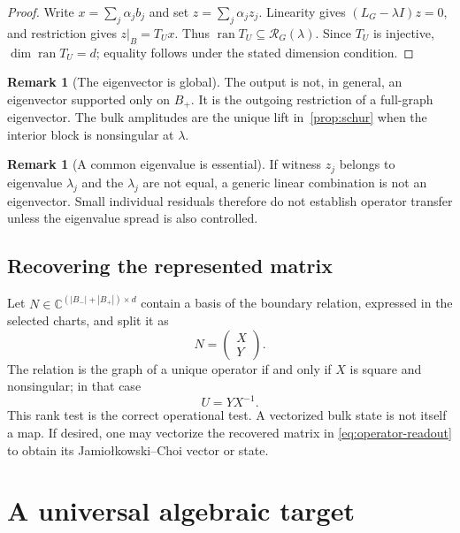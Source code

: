 \documentclass[11pt]{article}
\numberwithin{equation}{section}
\theoremstyle{definition}
\newtheorem{remark}[theorem]{Remark}
\theoremstyle{remark}
\newcommand{\C}{\mathbb{C}}
\newcommand{\ran}{\operatorname{ran}}
\begin{document}
\begin{proof}
Write $x=\sum_j\alpha_jb_j$ and set $z=\sum_j\alpha_jz_j$.  Linearity gives
$(L_G-\lambda I)z=0$, and restriction gives
$z|_B=T_Ux$.  Thus $\ran T_U\subseteq\mathcal R_G(\lambda)$.  Since $T_U$ is
injective, $\dim\ran T_U=d$; equality follows under the stated dimension
condition.
\end{proof}

\begin{remark}[The eigenvector is global]
The output is not, in general, an eigenvector supported only on $B_+$.  It is
the outgoing restriction of a full-graph eigenvector.  The bulk amplitudes are
the unique lift in~\cref{prop:schur} when the interior block is nonsingular at
$\lambda$.
\end{remark}

\begin{remark}[A common eigenvalue is essential]
If witness $z_j$ belongs to eigenvalue $\lambda_j$ and the $\lambda_j$ are not
equal, a generic linear combination is not an eigenvector.  Small individual
residuals therefore do not establish operator transfer unless the eigenvalue
spread is also controlled.
\end{remark}

\subsection{Recovering the represented matrix}

Let $N\in\C^{(|B_-|+|B_+|)\times d}$ contain a basis of the boundary relation,
expressed in the selected charts, and split it as
\begin{equation}
  N=\begin{pmatrix}X\\Y\end{pmatrix}.
\end{equation}
The relation is the graph of a unique operator if and only if $X$ is square and
nonsingular; in that case
\begin{equation}
  U=YX^{-1}.
  \label{eq:operator-readout}
\end{equation}
This rank test is the correct operational test.  A vectorized bulk state is not
itself a map.  If desired, one may vectorize the recovered matrix in
\eqref{eq:operator-readout} to obtain its Jamio\l kowski--Choi vector or state.

\section{A universal algebraic target}
\end{document}
